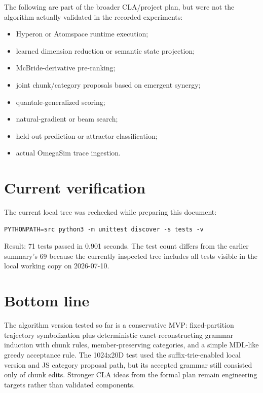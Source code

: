 \documentclass[11pt]{article}
\begin{document}
The following are part of the broader CLA/project plan, but were not the algorithm actually validated in the recorded experiments:

\begin{itemize}[leftmargin=*]
\item Hyperon or Atomspace runtime execution;
\item learned dimension reduction or semantic state projection;
\item McBride-derivative pre-ranking;
\item joint chunk/category proposals based on emergent synergy;
\item quantale-generalized scoring;
\item natural-gradient or beam search;
\item held-out prediction or attractor classification;
\item actual OmegaSim trace ingestion.
\end{itemize}

\section{Current verification}

The current local tree was rechecked while preparing this document:

\begin{lstlisting}
PYTHONPATH=src python3 -m unittest discover -s tests -v
\end{lstlisting}

Result: 71 tests passed in 0.901 seconds. The test count differs from the earlier summary's 69 because the currently inspected tree includes all tests visible in the local working copy on 2026-07-10.

\section{Bottom line}

The algorithm version tested so far is a conservative MVP: fixed-partition trajectory symbolization plus deterministic exact-reconstructing grammar induction with chunk rules, member-preserving categories, and a simple MDL-like greedy acceptance rule. The 1024x20D test used the suffix-trie-enabled local version and JS category proposal path, but its accepted grammar still consisted only of chunk edits. Stronger CLA ideas from the formal plan remain engineering targets rather than validated components.
\end{document}
